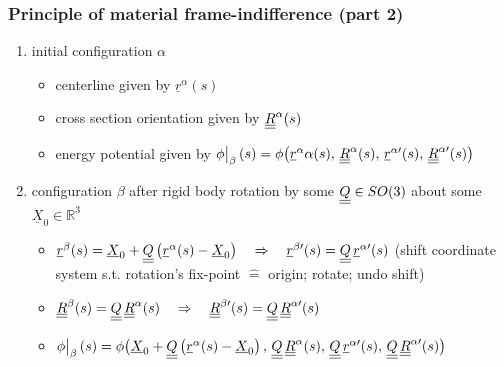 \begin{frame}
  \frametitle{Principle of material frame-indifference (part 2)}
  \vspace{-0.6em}
  \begin{enumerate}
    \item initial configuration $\alpha$
      \begin{itemize}
        \item centerline given by $\underline{r}^{\alpha}(s)$
        \item cross section orientation given by $\underline{\underline{R}}^{\alpha}(s)$
        \item energy potential given by $\eval[1]{\phi}_{\beta}(s) = \phi \bigl( \underline{r}^{\alpha}{\alpha}(s) , \, \doubleunderline{R}^{\alpha}(s) , \, \underline{r}^{\alpha \prime}(s) , \, \doubleunderline{R}^{\alpha \prime}(s) \bigr)$
      \end{itemize}
      
    \item configuration $\beta$ after rigid body rotation by some $\underline{\underline{Q}} \in SO(3)$ about some $\underline{X}_0 \in \mathbb{R}^3$
      \begin{itemize}
        \item $\underline{r}^{\beta}(s) = \underline{X}_0 + \underline{\underline{Q}} \left( \underline{r}^{\alpha}(s) - \underline{X}_0 \right) \quad \Rightarrow \quad \underline{r}^{\beta \prime}(s) = \underline{\underline{Q}} \, \underline{r}^{\alpha \prime}(s)$ \newline
          \null \quad (shift coordinate system s.t. rotation's fix-point $\hat{=}$ origin; rotate; undo shift)
        \item $\underline{\underline{R}}^{\beta}(s) = \underline{\underline{Q}} \, \underline{\underline{R}}^{\alpha}(s) \quad \Rightarrow \quad \underline{\underline{R}}^{\beta \prime}(s) = \underline{\underline{Q}} \, \underline{\underline{R}}^{\alpha \prime}(s)$
        \item $\eval[1]{\phi}_{\beta}(s) = \phi \bigl( \underline{X}_0 + \doubleunderline{Q} \left( \underline{r}^{\alpha}(s) - \underline{X}_0 \right) , \, \doubleunderline{Q} \, \doubleunderline{R}^{\alpha}(s) , \, \doubleunderline{Q} \, \underline{r}^{\alpha \prime}(s) , \, \doubleunderline{Q} \, \doubleunderline{R}^{\alpha \prime}(s) \bigr)$
      \end{itemize}
      

\end{enumerate}
\end{frame}
